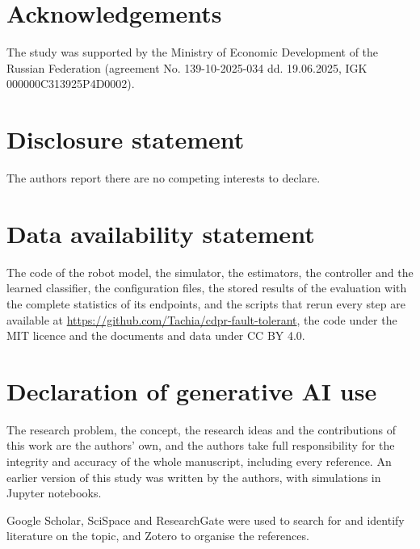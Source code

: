 \documentclass{interact}
\newif\ifblind
\begin{document}

\ifblind\else
\section*{Acknowledgements}
The study was supported by the Ministry of Economic Development of the Russian Federation (agreement No. 139-10-2025-034 dd. 19.06.2025, IGK 000000C313925P4D0002).
\fi

\section*{Disclosure statement}
The authors report there are no competing interests to declare.

\section*{Data availability statement}
\ifblind
The code of the robot model, the simulator, the estimators, the controller and the learned classifier, the configuration files, the stored results of the evaluation with the complete statistics of its endpoints, and the scripts that rerun every step are publicly available in an online repository, the code under the MIT licence and the documents and data under CC BY 4.0. Its address identifies the authors and is withheld for the anonymous review.
\else
The code of the robot model, the simulator, the estimators, the controller and the learned classifier, the configuration files, the stored results of the evaluation with the complete statistics of its endpoints, and the scripts that rerun every step are available at \url{https://github.com/Tachia/cdpr-fault-tolerant}, the code under the MIT licence and the documents and data under CC BY 4.0.
\fi

\section*{Declaration of generative AI use}
The research problem, the concept, the research ideas and the contributions of this work are the authors' own, and the authors take full responsibility for the integrity and accuracy of the whole manuscript, including every reference. An earlier version of this study was written by the authors, with simulations in Jupyter notebooks.

Google Scholar, SciSpace and ResearchGate were used to search for and identify literature on the topic, and Zotero to organise the references.
\end{document}
